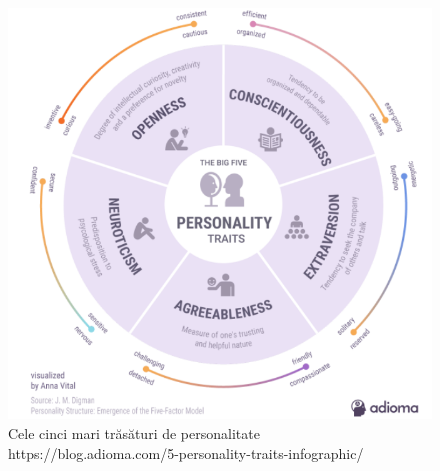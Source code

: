 \documentclass[a4paper, 12pt]{report}
\begin{document}
	\begin{figure}[h]
		\begin{center}
			\includegraphics[scale=0.5]{images/ocean.png}
		\end{center}
		\caption{Cele cinci mari trăsături de personalitate\newline
			\hspace{\linewidth}https://blog.adioma.com/5-personality-traits-infographic/}
		\label{fig:ocean}
	\end{figure}
	
\end{document}
